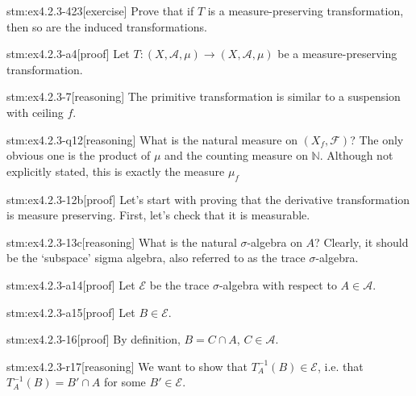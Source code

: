 
\begin{stm}{stm:ex4.2.3-423}[exercise]
Prove that if $T$ is a measure-preserving transformation, then so are the induced transformations.
\end{stm}


\begin{stm}{stm:ex4.2.3-a4}[proof]
Let $T : (X, \mathcal{A}, \mu) \to (X, \mathcal{A}, \mu)$ be a measure-preserving transformation.
\end{stm}

\begin{stm}{stm:ex4.2.3-7}[reasoning]
The primitive transformation is similar to a suspension with ceiling $f$.
\end{stm}

\begin{stm}{stm:ex4.2.3-q12}[reasoning]
What is the natural measure on $(X_f, \mathcal{F})$? The only obvious one is the product of $\mu$ and the counting measure on $\mathbb{N}$. Although not explicitly stated, this is exactly the measure $\mu_f$
\end{stm}

\begin{stm}{stm:ex4.2.3-12b}[proof]
Let's start with proving that the derivative transformation is measure preserving. First, let's check that it is measurable. 
\end{stm}

\begin{stm}{stm:ex4.2.3-13c}[reasoning]
What is the natural $\sigma$-algebra on $A$? Clearly, it should be the ‘subspace’ sigma algebra, also referred to as the trace $\sigma$-algebra.
\end{stm}

\begin{stm}{stm:ex4.2.3-a14}[proof]
Let $\mathcal{E}$ be the trace $\sigma$-algebra with respect to $A \in \mathcal{A}$.
\end{stm}

\begin{stm}{stm:ex4.2.3-a15}[proof]
Let $B \in \mathcal{E}$.
\end{stm}

\begin{stm}{stm:ex4.2.3-16}[proof]
By definition, $B = C \cap A$, $C \in \mathcal{A}$.
\end{stm}

\begin{stm}{stm:ex4.2.3-r17}[reasoning]
We want to show that $T_A^{-1}(B) \in \mathcal{E}$, i.e. that $T_A^{-1}(B) = B' \cap A$ for some $B' \in \mathcal{E}$.
\end{stm}

